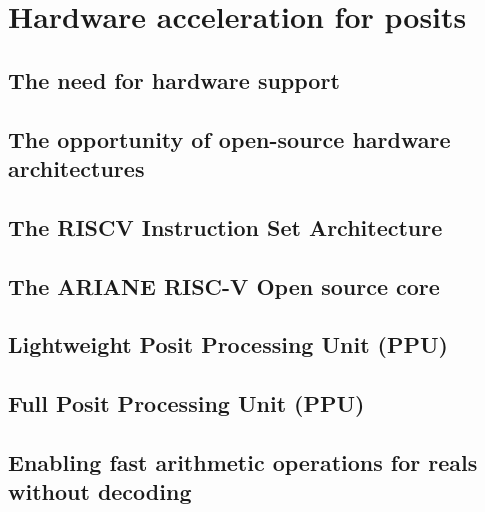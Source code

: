\chapter{Hardware acceleration for posits}
\section{The need for hardware support}
\section{The opportunity of open-source hardware architectures}
\section{The RISCV Instruction Set Architecture}
\section{The ARIANE RISC-V Open source core}
\section{Lightweight Posit Processing Unit (PPU)}
\section{Full Posit Processing Unit (PPU)}

\section{Enabling fast arithmetic operations for reals without decoding}